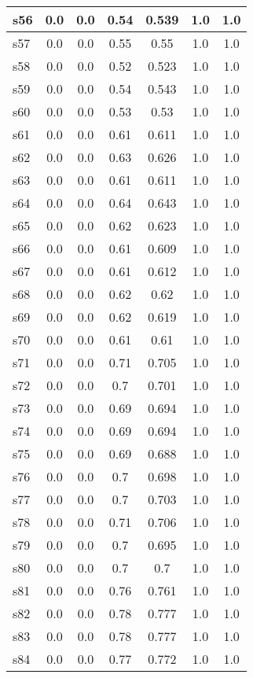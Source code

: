 \documentclass{article}
\begin{document}
\begin{tabular}{|l|c|c|c|c|c|c|}
\hline
s56 &0.0 & 0.0 & 0.54 & 0.539 & 1.0 & 1.0\\
\hline
s57 &0.0 & 0.0 & 0.55 & 0.55 & 1.0 & 1.0\\
\hline
s58 &0.0 & 0.0 & 0.52 & 0.523 & 1.0 & 1.0\\
\hline
s59 &0.0 & 0.0 & 0.54 & 0.543 & 1.0 & 1.0\\
\hline
s60 &0.0 & 0.0 & 0.53 & 0.53 & 1.0 & 1.0\\
\hline
s61 &0.0 & 0.0 & 0.61 & 0.611 & 1.0 & 1.0\\
\hline
s62 &0.0 & 0.0 & 0.63 & 0.626 & 1.0 & 1.0\\
\hline
s63 &0.0 & 0.0 & 0.61 & 0.611 & 1.0 & 1.0\\
\hline
s64 &0.0 & 0.0 & 0.64 & 0.643 & 1.0 & 1.0\\
\hline
s65 &0.0 & 0.0 & 0.62 & 0.623 & 1.0 & 1.0\\
\hline
s66 &0.0 & 0.0 & 0.61 & 0.609 & 1.0 & 1.0\\
\hline
s67 &0.0 & 0.0 & 0.61 & 0.612 & 1.0 & 1.0\\
\hline
s68 &0.0 & 0.0 & 0.62 & 0.62 & 1.0 & 1.0\\
\hline
s69 &0.0 & 0.0 & 0.62 & 0.619 & 1.0 & 1.0\\
\hline
s70 &0.0 & 0.0 & 0.61 & 0.61 & 1.0 & 1.0\\
\hline
s71 &0.0 & 0.0 & 0.71 & 0.705 & 1.0 & 1.0\\
\hline
s72 &0.0 & 0.0 & 0.7 & 0.701 & 1.0 & 1.0\\
\hline
s73 &0.0 & 0.0 & 0.69 & 0.694 & 1.0 & 1.0\\
\hline
s74 &0.0 & 0.0 & 0.69 & 0.694 & 1.0 & 1.0\\
\hline
s75 &0.0 & 0.0 & 0.69 & 0.688 & 1.0 & 1.0\\
\hline
s76 &0.0 & 0.0 & 0.7 & 0.698 & 1.0 & 1.0\\
\hline
s77 &0.0 & 0.0 & 0.7 & 0.703 & 1.0 & 1.0\\
\hline
s78 &0.0 & 0.0 & 0.71 & 0.706 & 1.0 & 1.0\\
\hline
s79 &0.0 & 0.0 & 0.7 & 0.695 & 1.0 & 1.0\\
\hline
s80 &0.0 & 0.0 & 0.7 & 0.7 & 1.0 & 1.0\\
\hline
s81 &0.0 & 0.0 & 0.76 & 0.761 & 1.0 & 1.0\\
\hline
s82 &0.0 & 0.0 & 0.78 & 0.777 & 1.0 & 1.0\\
\hline
s83 &0.0 & 0.0 & 0.78 & 0.777 & 1.0 & 1.0\\
\hline
s84 &0.0 & 0.0 & 0.77 & 0.772 & 1.0 & 1.0\\

\end{tabular}
\end{document}

